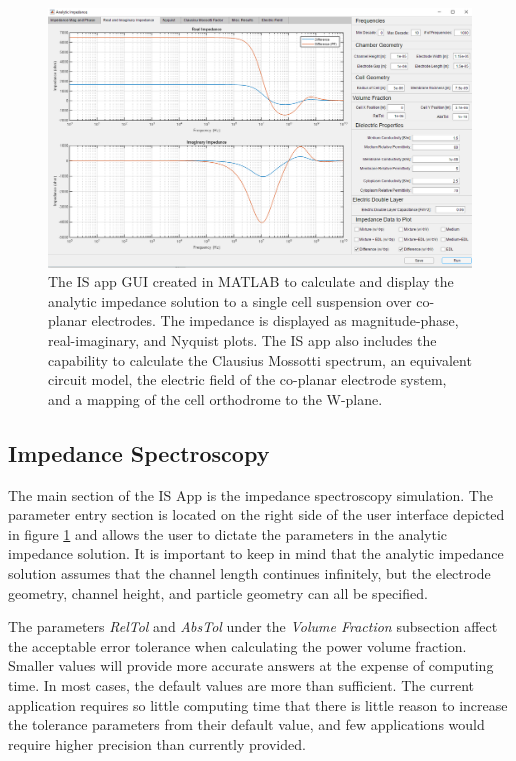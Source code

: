 \begin{figure}[h]
    \centering
    \includegraphics[width=\textwidth]{images/analyticImpedanceApp.png}
    \caption[IS App]{The IS app GUI created in MATLAB to calculate and display the analytic impedance solution to a single cell suspension over co-planar electrodes. The impedance is displayed as magnitude-phase, real-imaginary, and Nyquist plots. The IS app also includes the capability to calculate the Clausius Mossotti spectrum, an equivalent circuit model, the electric field of the co-planar electrode system, and a mapping of the cell orthodrome to the W-plane.}
    \label{fig:matlab_IS_app}
\end{figure}

\subsection*{Impedance Spectroscopy}

\par The main section of the IS App is the impedance spectroscopy simulation. The parameter entry section is located on the right side of the user interface depicted in figure \ref{fig:matlab_IS_app} and allows the user to dictate the parameters in the analytic impedance solution. It is important to keep in mind that the analytic impedance solution assumes that the channel length continues infinitely, but the electrode geometry, channel height, and particle geometry can all be specified. 

\par The parameters \textit{RelTol} and \textit{AbsTol} under the \textit{Volume Fraction} subsection affect the acceptable error tolerance when calculating the power volume fraction. Smaller values will provide more accurate answers at the expense of computing time. In most cases, the default values are more than sufficient. The current application requires so little computing time that there is little reason to increase the tolerance parameters from their default value, and few applications would require higher precision than currently provided.

